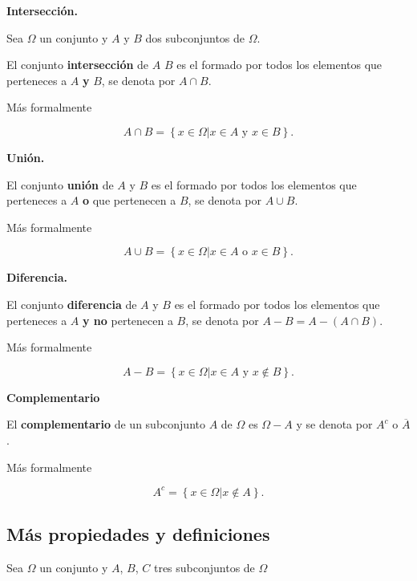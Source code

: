\documentclass[]{book}
\begin{document}
\textbf{Intersección.}

Sea \(\Omega\) un conjunto y \(A\) y \(B\) dos subconjuntos de \(\Omega\).

El conjunto \textbf{intersección} de \(A\) \(B\) es el formado por todos los elementos que perteneces a \(A\) \textbf{y} \(B\), se denota por \(A\cap B\).

Más formalmente

\[
A\cap B=\left\{x\in\Omega \big| x\in A \mbox{ y } x\in B\right\}.
\]

\textbf{Unión.}

El conjunto \textbf{unión} de \(A\) y \(B\) es el formado por todos los elementos que perteneces a \(A\) \textbf{o} que pertenecen a \(B\), se denota por \(A\cup B\).

Más formalmente

\[
A\cup B=\left\{x\in\Omega \big| x\in A \mbox{ o } x\in B\right\}.
\]

\textbf{Diferencia.}

El conjunto \textbf{diferencia} de \(A\) y \(B\) es el formado por todos los elementos que perteneces a \(A\) \textbf{y no} pertenecen a \(B\), se denota por \(A-B=A-(A\cap B)\).

Más formalmente

\[
A- B=\left\{x\in\Omega \big| x\in A \mbox{ y } x\notin B\right\}.
\]

\textbf{Complementario}

El \textbf{complementario} de un subconjunto \(A\) de \(\Omega\) es \(\Omega-A\) y se denota por \(A^c\) o \(\overline{A}\).

Más formalmente

\[
A^c=\left\{x\in\Omega \big| x\not\in A\right\}.
\]

\hypertarget{muxe1s-propiedades-y-definiciones}{%
\subsection{Más propiedades y definiciones}\label{muxe1s-propiedades-y-definiciones}}

Sea \(\Omega\) un conjunto y \(A\), \(B\), \(C\) tres subconjuntos de \(\Omega\)
\end{document}
